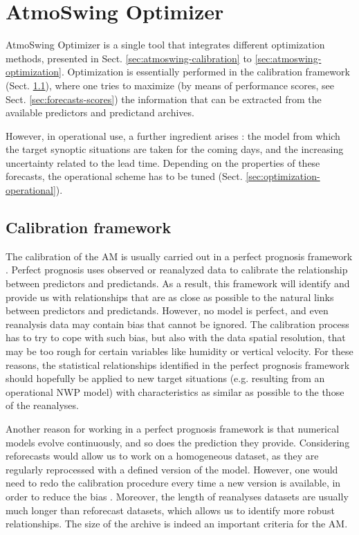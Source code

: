 \documentclass[review]{elsarticle}
\begin{document}
\section{AtmoSwing Optimizer}
\label{sec:optimizer}

AtmoSwing Optimizer is a single tool that integrates different optimization methods, presented in Sect. \ref{sec:atmoswing-calibration} to \ref{sec:atmoswing-optimization}. Optimization is essentially performed in the calibration framework (Sect. \ref{sec:calibration-framework}), where one tries to maximize (by means of performance scores, see Sect. \ref{sec:forecasts-scores}) the information that can be extracted from the available predictors and predictand archives.

However, in operational use, a further ingredient arises : the model from which the target synoptic situations are taken for the coming days, and the increasing uncertainty related to the lead time. Depending on the properties of these forecasts, the operational scheme has to be tuned (Sect. \ref{sec:optimization-operational}).


\subsection{Calibration framework}
\label{sec:calibration-framework}

The calibration of the AM is usually carried out in a perfect prognosis \citep{Klein1959} framework \citep{Bontron2004, BenDaoud2010}. Perfect prognosis uses observed or reanalyzed data to calibrate the relationship between predictors and predictands. As a result, this framework will identify and provide us with relationships that are as close as possible to the natural links between predictors and predictands. However, no model is perfect, and even reanalysis data may contain bias that cannot be ignored. The calibration process has to try to cope with such bias, but also with the data spatial resolution, that may be too rough for certain variables like humidity or vertical velocity. For these reasons, the statistical relationships identified in the perfect prognosis framework should hopefully be applied to new target situations (e.g. resulting from an operational NWP model) with characteristics as similar as possible to the those of the reanalyses.

Another reason for working in a perfect prognosis framework is that numerical models evolve continuously, and so does the prediction they provide. Considering reforecasts would allow us to work on a homogeneous dataset, as they are regularly reprocessed with a defined version of the model. However, one would need to redo the calibration procedure every time a new version is available, in order to reduce the bias \citep{Wilson2002}. Moreover, the length of reanalyses datasets are usually much longer than reforecast datasets, which allows us to identify more robust relationships. The size of the archive is indeed an important criteria for the AM.
\end{document}
